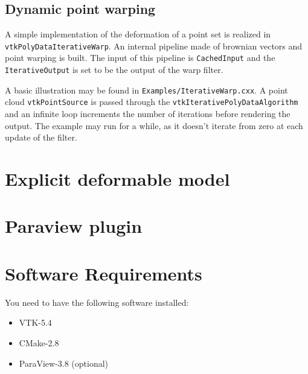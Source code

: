 \documentclass{InsightArticle}
\begin{document}
\subsection{Dynamic point warping}
%
A simple implementation of the deformation of a point set is realized in
\verb!vtkPolyDataIterativeWarp!. An internal pipeline made of brownian vectors
and point warping is built. The input of this pipeline is \verb!CachedInput!
and the \verb!IterativeOutput! is set to be the output of the warp filter.

A basic illustration may be found in \verb!Examples/IterativeWarp.cxx!. A point
cloud \verb!vtkPointSource! is passed through the 
\verb!vtkIterativePolyDataAlgorithm! and an infinite loop increments the 
number of iterations before rendering the output. The example may run for a 
while, as it doesn't iterate from zero at each update of the filter.
%
\section{Explicit deformable model}
%

%
\section{Paraview plugin}
%

%
\section{Software Requirements}

You need to have the following software installed:

\begin{itemize}
  \item  VTK-5.4
  \item  CMake-2.8
  \item  ParaView-3.8 (optional)
\end{itemize}

\appendix

%
%



\end{document}
